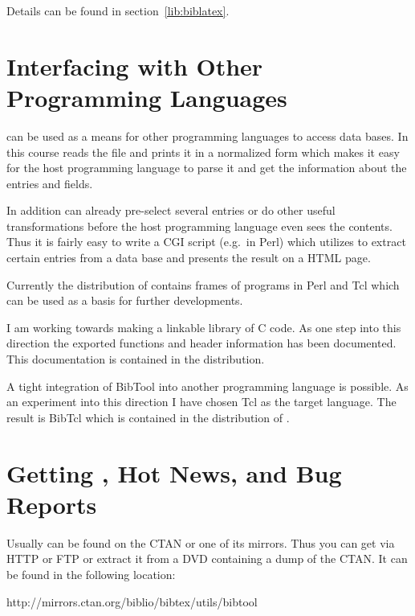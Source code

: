 \documentclass[11pt,a4paper]{scrbook}
\begin{document}
Details can be found in section~\ref{lib:biblatex}.

\section{Interfacing \BibTool{} with Other Programming Languages}

\BibTool{} can be used as a means for other programming languages to access
\BibTeX{} data bases. In this course \BibTool{} reads the \BibTeX{} file and
prints it in a normalized form which makes it easy for the host programming
language to parse it and get the information about the entries and fields.

In addition \BibTool{} can already pre-select several entries or do other
useful transformations before the host programming language even sees the
contents.  Thus it is fairly easy to write a CGI script (e.g.\ in Perl) which
utilizes \BibTool{} to extract certain entries from a \BibTeX{} data base and
presents the result on a HTML page.

Currently the distribution of \BibTool{} contains frames of programs in Perl
and Tcl which can be used as a basis for further developments.

I am working towards making \BibTool{} a linkable library of C code. As one
step into this direction the exported functions and header information has
been documented. This documentation is contained in the distribution.

A tight integration of BibTool into another programming language is possible.
As an experiment into this direction I have chosen Tcl as the target language.
The result is BibTcl which is contained in the distribution of \BibTool.


\section{Getting \BibTool, Hot News, and Bug Reports}

Usually \BibTool{} can be found on the CTAN or one of its mirrors. Thus you
can get \BibTool{} via HTTP or FTP or extract it from a DVD containing a dump
of the CTAN. It can be found in the following location:
\begin{list}{}{}
\item {}%
  {http://mirrors.ctan.org/biblio/bibtex/utils/bibtool}
\end{list}
\end{document}
